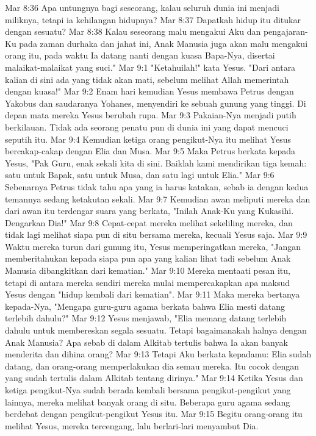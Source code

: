 Mar 8:36  Apa untungnya bagi seseorang, kalau seluruh dunia ini menjadi miliknya, tetapi ia kehilangan hidupnya?
Mar 8:37  Dapatkah hidup itu ditukar dengan sesuatu?
Mar 8:38  Kalau seseorang malu mengakui Aku dan pengajaran-Ku pada zaman durhaka dan jahat ini, Anak Manusia juga akan malu mengakui orang itu, pada waktu Ia datang nanti dengan kuasa Bapa-Nya, disertai malaikat-malaikat yang suci."
Mar 9:1  "Ketahuilah!" kata Yesus. "Dari antara kalian di sini ada yang tidak akan mati, sebelum melihat Allah memerintah dengan kuasa!"
Mar 9:2  Enam hari kemudian Yesus membawa Petrus dengan Yakobus dan saudaranya Yohanes, menyendiri ke sebuah gunung yang tinggi. Di depan mata mereka Yesus berubah rupa.
Mar 9:3  Pakaian-Nya menjadi putih berkilauan. Tidak ada seorang penatu pun di dunia ini yang dapat mencuci seputih itu.
Mar 9:4  Kemudian ketiga orang pengikut-Nya itu melihat Yesus bercakap-cakap dengan Elia dan Musa.
Mar 9:5  Maka Petrus berkata kepada Yesus, "Pak Guru, enak sekali kita di sini. Baiklah kami mendirikan tiga kemah: satu untuk Bapak, satu untuk Musa, dan satu lagi untuk Elia."
Mar 9:6  Sebenarnya Petrus tidak tahu apa yang ia harus katakan, sebab ia dengan kedua temannya sedang ketakutan sekali.
Mar 9:7  Kemudian awan meliputi mereka dan dari awan itu terdengar suara yang berkata, "Inilah Anak-Ku yang Kukasihi. Dengarkan Dia!"
Mar 9:8  Cepat-cepat mereka melihat sekeliling mereka, dan tidak lagi melihat siapa pun di situ bersama mereka, kecuali Yesus saja.
Mar 9:9  Waktu mereka turun dari gunung itu, Yesus memperingatkan mereka, "Jangan memberitahukan kepada siapa pun apa yang kalian lihat tadi sebelum Anak Manusia dibangkitkan dari kematian."
Mar 9:10  Mereka mentaati pesan itu, tetapi di antara mereka sendiri mereka mulai mempercakapkan apa maksud Yesus dengan "hidup kembali dari kematian".
Mar 9:11  Maka mereka bertanya kepada-Nya, "Mengapa guru-guru agama berkata bahwa Elia mesti datang terlebih dahulu?"
Mar 9:12  Yesus menjawab, "Elia memang datang terlebih dahulu untuk membereskan segala sesuatu. Tetapi bagaimanakah halnya dengan Anak Manusia? Apa sebab di dalam Alkitab tertulis bahwa Ia akan banyak menderita dan dihina orang?
Mar 9:13  Tetapi Aku berkata kepadamu: Elia sudah datang, dan orang-orang memperlakukan dia semau mereka. Itu cocok dengan yang sudah tertulis dalam Alkitab tentang dirinya."
Mar 9:14  Ketika Yesus dan ketiga pengikut-Nya sudah berada kembali bersama pengikut-pengikut yang lainnya, mereka melihat banyak orang di situ. Beberapa guru agama sedang berdebat dengan pengikut-pengikut Yesus itu.
Mar 9:15  Begitu orang-orang itu melihat Yesus, mereka tercengang, lalu berlari-lari menyambut Dia.
